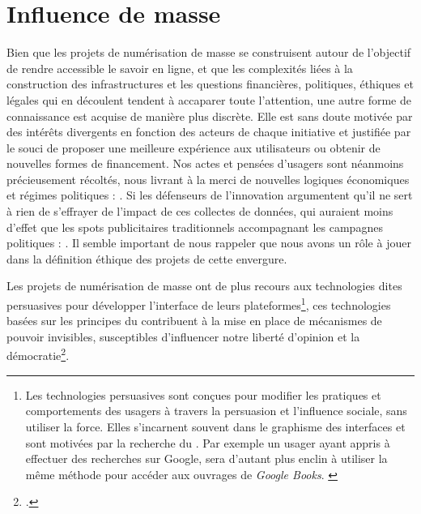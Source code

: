 \section {Influence de masse}

Bien que les projets de numérisation de masse se construisent autour de l'objectif de rendre accessible le savoir en ligne, et que les complexités liées à la construction des infrastructures et les questions financières, politiques, éthiques et légales qui en découlent tendent à accaparer toute l'attention, une autre forme de connaissance est acquise de manière plus discrète. Elle est sans doute motivée par des intérêts divergents en fonction des acteurs de chaque initiative et justifiée par le souci de proposer une meilleure expérience aux utilisateurs ou obtenir de nouvelles formes de financement. Nos actes et pensées d'usagers sont néanmoins précieusement récoltés, nous livrant à la merci de nouvelles logiques économiques et régimes politiques : . 
Si les défenseurs de l'innovation argumentent qu'il ne sert à rien de s'effrayer de l'impact de ces collectes de données, qui auraient moins d'effet que les spots publicitaires traditionnels accompagnant les campagnes politiques : . Il semble important de nous rappeler que nous avons un rôle à jouer dans la définition éthique des projets de cette envergure.

Les projets de numérisation de masse ont de plus recours aux technologies dites persuasives pour développer l'interface de leurs plateformes\footnote{Les technologies persuasives sont conçues pour modifier les pratiques et comportements des usagers à travers la persuasion et l'influence sociale, sans utiliser la force. Elles s'incarnent souvent dans le graphisme des interfaces et sont motivées par la recherche du . Par exemple un usager ayant appris à effectuer des recherches sur Google, sera d'autant plus enclin à utiliser la même méthode pour accéder aux ouvrages de \textit{Google Books}. \cite{thelle_persuasive_2011}}, ces technologies basées sur les principes du  contribuent à la mise en place de mécanismes de pouvoir invisibles, susceptibles d'influencer notre liberté d'opinion et la démocratie\footcite{thelle_persuasive_2011}. 

